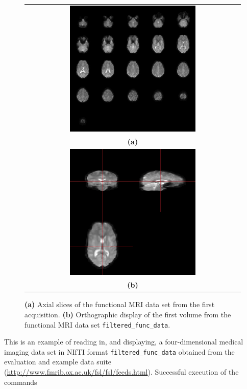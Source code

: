 \documentclass[
]{article}
\begin{document}
\begin{figure}[tbp]
  \begin{center}
    \begin{tabular}{c}
      \includegraphics*[width=0.6\textwidth]{ffd.jpeg}\\
      \textbf{(a)}\\
      \includegraphics*[width=0.6\textwidth]{ffd_orthographic.jpeg}\\
      \textbf{(b)}
    \end{tabular}
  \end{center}
  \caption{\textbf{(a)} Axial slices of the functional MRI data set
     from the first acquisition.
    \textbf{(b)} Orthographic display of the first volume from the
    functional MRI data set \texttt{filtered\_func\_data}.}
  \label{fig:ffd+orthographic}
\end{figure}

This is an example of reading in, and displaying, a four-dimensional
medical imaging data set in NIfTI format \texttt{filtered\_func\_data}
obtained from the  evaluation and example data suite
(\url{http://www.fmrib.ox.ac.uk/fsl/fsl/feeds.html}). Successful
execution of the commands
\end{document}
